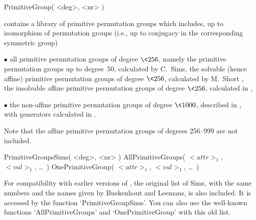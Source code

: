 

\>PrimitiveGroup( <deg>, <nr> )

{\GAP} contains a library of primitive permutation groups which includes,
up to  isomorphism of permutation groups   (i.e., up to conjugacy  in the
corresponding symmetric group)
{\parindent\manindent
\item{$\bullet$} all   primitive permutation  groups  of  degree $\<256$,
  namely
\itemitem{$\circ$}  the  primitive permutation  groups   up to degree~50,
  calculated by C.~Sims,
\itemitem{$\circ$}  the  solvable (hence  affine)   primitive permutation
  groups of degree $\<256$, calculated by M.~Short \cite{Short92},
\itemitem{$\circ$} the insolvable affine  primitive permutation groups of
  degree $\<256$, calculated in \cite{Theissen97},
\item{$\bullet$} the non-affine primitive   permutation groups of  degree
  $\<1000$,  described   in   \cite{DixonMortimer88},  with    generators
  calculated in \cite{Theissen97}.\par}
Note that the affine primitive permutation groups of degrees 256--999 are
not included.

\>PrimitiveGroupsSims( <deg>, <nr> )
\>AllPrimitiveGroups( $<attr>_1$, $<val>_1$, \dots\ )
\>OnePrimitiveGroup( $<attr>_1$, $<val>_1$, \dots\ )

For compatibility  with earlier versions  of {\GAP}, the original list of
Sims,  with  the same numbers  and  the  names  given by  Buekenhout  and
Leemans,  is     also  included.   It is    accessed     by  the function
`PrimitiveGroupSims'.   You   can   also use  the    well-known functions
`AllPrimitiveGroups' and `OnePrimitiveGroup' with this old list.

